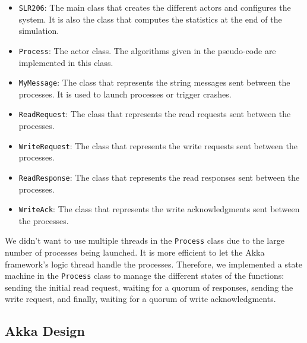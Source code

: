 \documentclass{article}
\begin{document}
\begin{itemize}
    \item \texttt{SLR206}: The main class that creates the different actors and configures the system. It is also the class that computes the statistics at the end of the simulation.

    \item \texttt{Process}: The actor class. The algorithms given in the pseudo-code are implemented in this class.

    \item \texttt{MyMessage}: The class that represents the string messages sent between the processes. It is used to launch processes or trigger crashes.

    \item \texttt{ReadRequest}: The class that represents the read requests sent between the processes.

    \item \texttt{WriteRequest}: The class that represents the write requests sent between the processes.

    \item \texttt{ReadResponse}: The class that represents the read responses sent between the processes.

    \item \texttt{WriteAck}: The class that represents the write acknowledgments sent between the processes.
\end{itemize}

We didn't want to use multiple threads in the \texttt{Process} class due to the large number of processes
being launched. It is more efficient to let the Akka framework's logic thread handle the processes.
Therefore, we implemented a state machine in the \texttt{Process} class to manage the different states
of the functions: sending the initial read request, waiting for a quorum of responses, sending the
write request, and finally, waiting for a quorum of write acknowledgments.


\newpage
\subsection{Akka Design}
\end{document}
